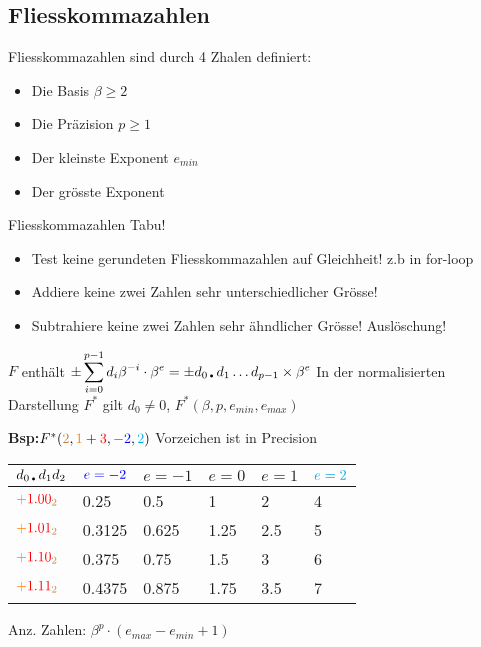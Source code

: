 \subsection{Fliesskommazahlen}
Fliesskommazahlen sind durch 4 Zhalen definiert:
\begin{itemize}
	\item Die Basis $\beta \geqslant 2$
	\item Die Präzision $p \geqslant 1$
	\item Der kleinste Exponent $e_{min}$
	\item Der grösste Exponent	
\end{itemize}
Fliesskommazahlen Tabu!
\begin{itemize}
	\item Test keine gerundeten Fliesskommazahlen auf Gleichheit! z.b in for-loop
	\item Addiere keine zwei Zahlen  sehr unterschiedlicher Grösse! 
	\item Subtrahiere keine zwei Zahlen sehr ähndlicher Grösse! Auslöschung!

\end{itemize}
$F$ enthält $\displaystyle \pm\sum_{i=0}^{p-1}d_i \beta^{-i}\cdot \beta^{e} =  \pm d_{0\text{\textbullet}} d_1\dots d_{p-1} \times \beta^e$
In der normalisierten Darstellung $F^{\ast}$ gilt $d_0 \neq 0$, $F^{\ast}(\beta,p,e_{min},e_{max})$ 

\textbf{Bsp:$F^{\ast}({\color{brown}{2}},{\color{orange}{1}}+{\color{red}{3}},{\color{blue}{-2}},{\color{cyan}{2}})$} Vorzeichen ist in Precision
\begin{center}
	\begin{tabular} { m{0.8cm} | m{0.8cm} m{0.95cm} m{0.7cm} m{0.7cm}m{0.6cm} }
	 $d_{0\text{\textbullet}} d_1 d_2$ & ${\color{blue}{e=-2}}$&$e=-1$&$e=0$&$e=1$&${\color{cyan}{e=2}}$\\
	 \hline
	 ${\color{orange}{+}}{\color{red}{1.00}}{\color{brown}{_2}}$ & 0.25   & 0.5   & 1    & 2   & 4\\
	 ${\color{orange}{+}}{\color{red}{1.01}}{\color{brown}{_2}}$ & 0.3125 & 0.625 & 1.25 & 2.5 & 5\\
	 ${\color{orange}{+}}{\color{red}{1.10}}{\color{brown}{_2}}$ & 0.375  & 0.75  & 1.5  & 3   & 6\\
	 ${\color{orange}{+}}{\color{red}{1.11}}{\color{brown}{_2}}$ & 0.4375 & 0.875 & 1.75 & 3.5 & 7\\
	 \hline
	\end{tabular}
\end{center}
Anz. Zahlen: $\beta^{p}\cdot (e_{max}-e_{min}+1) $


